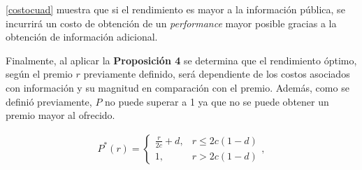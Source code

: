 \ref{costocuad} muestra que si el rendimiento es mayor a la información pública, se incurrirá un costo de obtención de un \textit{performance} mayor posible gracias a la obtención de información adicional.
\vspace{2.5mm}

Finalmente, al aplicar la \textbf{Proposición 4} se determina que el rendimiento óptimo, según el premio $r$ previamente definido, será dependiente de los costos asociados con información y su magnitud en comparación con el premio. Además, como se definió previamente, $P$ no puede superar a 1 ya que no se puede obtener un premio mayor al ofrecido.

\begin{equation}
\begin{array}{rrclcl}
    P^*(r) = \begin{cases}\frac{r}{2c}+d,&r\leq 2c(1-d)\\1,&r>2c(1-d)\end{cases}, \label{perforopt}\\
\end{array}
\end{equation}





